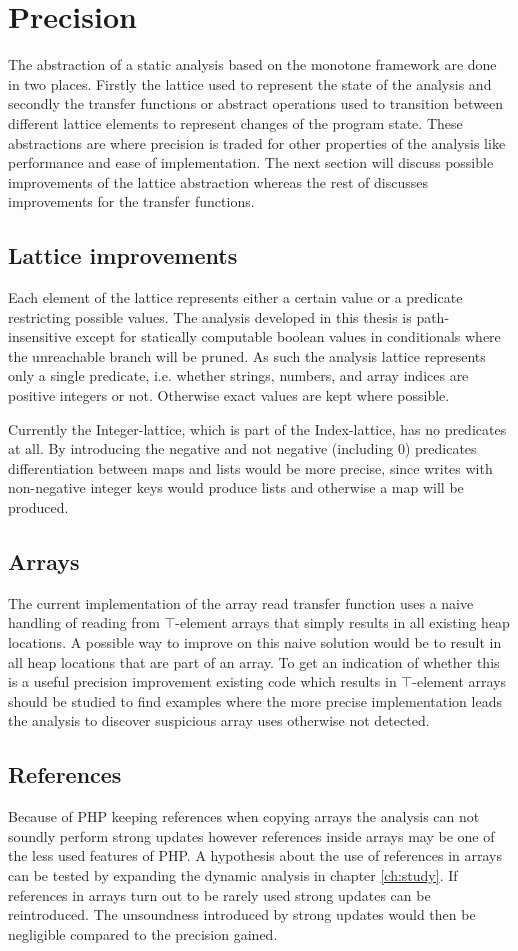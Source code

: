 \section{Precision}
The abstraction of a static analysis based on the monotone framework are done in two places. Firstly the lattice used to represent the state of the analysis and secondly the transfer functions or abstract operations used to transition between different lattice elements to represent changes of the program state. These abstractions are where precision is traded for other properties of the analysis like performance and ease of implementation. The next section will discuss possible improvements of the lattice abstraction whereas the rest of discusses improvements for the transfer functions.

\subsection{Lattice improvements}
Each element of the lattice represents either a certain value or a predicate restricting possible values. The analysis developed in this thesis is path-insensitive except for statically computable boolean values in conditionals where the unreachable branch will be pruned. As such the analysis lattice represents only a single predicate, i.e. whether strings, numbers, and array indices are positive integers or not. Otherwise exact values are kept where possible. 

Currently the Integer-lattice, which is part of the Index-lattice, has no predicates at all. By introducing the negative and not negative (including 0) predicates differentiation between maps and lists would be more precise, since writes with non-negative integer keys would produce lists and otherwise a map will be produced.

\subsection{Arrays}
The current implementation of the array read transfer function uses a naive handling of reading from $\top$-element arrays that simply results in all existing heap locations. A possible way to improve on this naive solution would be to result in all heap locations that are part of an array. To get an indication of whether this is a useful precision improvement existing code which results in $\top$-element arrays should be studied to find examples where the more precise implementation leads the analysis to discover suspicious array uses otherwise not detected.

\subsection{References}
Because of PHP keeping references when copying arrays the analysis can not soundly perform strong updates however references inside arrays may be one of the less used features of PHP. A hypothesis about the use of references in arrays can be tested by expanding the dynamic analysis in chapter \ref{ch:study}. If references in arrays turn out to be rarely used strong updates can be reintroduced. The unsoundness introduced by strong updates would then be negligible compared to the precision gained.